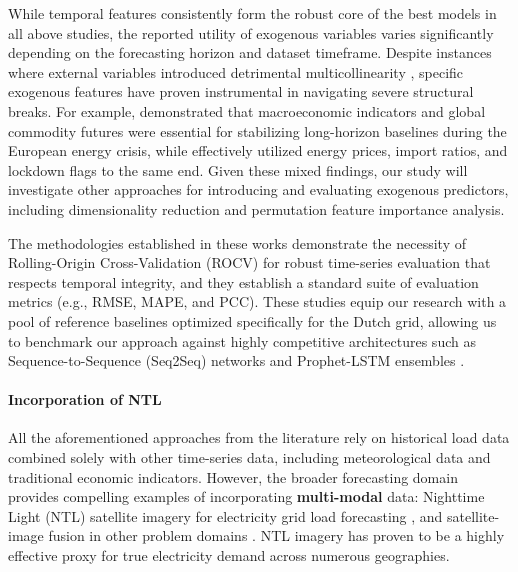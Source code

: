 While temporal features consistently form the robust core of the best models in all above studies, the reported utility of exogenous variables varies significantly depending on the forecasting horizon and dataset timeframe. Despite instances where external variables introduced detrimental multicollinearity \cite{van_de_sande_enhancing_2024}, specific exogenous features have proven instrumental in navigating severe structural breaks. For example, \cite{curiel_integrating_2025} demonstrated that macroeconomic indicators and global commodity futures were essential for stabilizing long-horizon baselines during the European energy crisis, while \cite{ashtar_hybrid_2025} effectively utilized energy prices, import ratios, and lockdown flags to the same end. Given these mixed findings, our study will investigate other approaches for introducing and evaluating exogenous predictors, including dimensionality reduction and permutation feature importance analysis. 

The methodologies established in these works \cite{curiel_integrating_2025,van_de_sande_enhancing_2024,ashtar_hybrid_2025} demonstrate the necessity of Rolling-Origin Cross-Validation (ROCV) for robust time-series evaluation that respects temporal integrity, and they establish a standard suite of evaluation metrics (e.g., RMSE, MAPE, and PCC). These studies equip our research with a pool of reference baselines optimized specifically for the Dutch grid, allowing us to benchmark our approach against highly competitive architectures such as Sequence-to-Sequence (Seq2Seq) networks \cite{ashtar_hybrid_2025} and Prophet-LSTM ensembles \cite{van_de_sande_enhancing_2024}.

\paragraph{Incorporation of NTL} All the aforementioned approaches from the literature rely on historical load data combined solely with other time-series data, including meteorological data and traditional economic indicators. However, the broader forecasting domain provides compelling examples of incorporating \textbf{multi-modal} data: Nighttime Light (NTL) satellite imagery for electricity grid load forecasting \cite{borunda_machine_2025,r_forecasting_2025,chen_monthly_2025}, and satellite-image fusion in other problem domains \cite{schubnel_solarcrossformer_2025,wang_causal-aware_2025}. NTL imagery has proven to be a highly effective proxy for true electricity demand across numerous geographies. 

